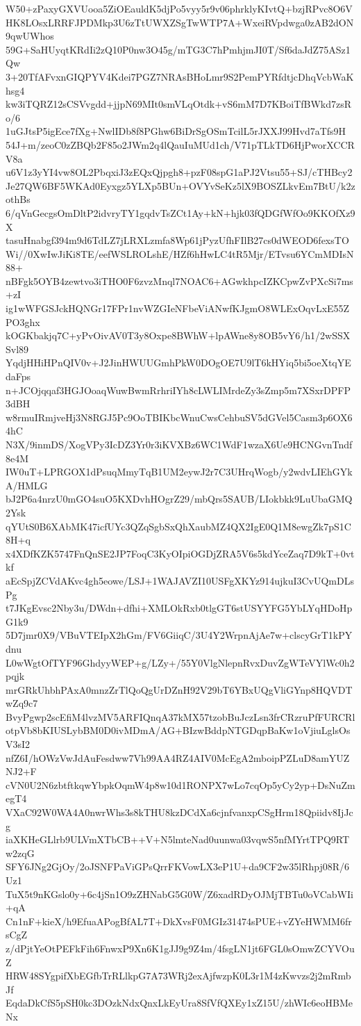 W50+zPaxyGXVUooa5ZiOEauldK5djPo5vyy5r9v06phrklyKIvtQ+bzjRPvc8O6V
HK8LOsxLRRFJPDMkp3U6zTtUWXZSgTwWTP7A+WxeiRVpdwga0zAB2dON9qwUWhos
59G+SaHUyqtKRdIi2zQ10P0nw3O45g/mTG3C7hPmhjmJI0T/Sf6daJdZ75ASz1Qw
3+20TfAFvxnGIQPYV4Kdei7PGZ7NRAsBHoLmr9S2PemPYRfdtjcDhqVcbWaKhsg4
kw3iTQRZ12sCSVvgdd+jjpN69MIt0smVLqOtdk+vS6mM7D7KBoiTfBWkd7zsRo/6
1uGJtsP5igEce7fXg+NwlIDb8f8PGhw6BiDrSgOSmTcilL5rJXXJ99Hvd7aTfs9H
54J+m/zeoC0zZBQb2F85o2JWm2q4lQauIuMUd1ch/V71pTLkTD6HjPworXCCRV8a
u6V1z3yYI4vw8OL2PbqxiJ3zEQxQjpgh8+pzF08spG1aPJ2Vtsu55+SJ/cTHBcy2
Je27QW6BF5WKAd0Eyxgz5YLXp5BUn+OVYvSeKz5lX9BOSZLkvEm7BtU/k2zothBs
6/qVnGecgsOmDltP2idvryTY1gqdvTsZCt1Ay+kN+hjk03fQDGfWfOo9KKOfXz9X
tasuHnabgf394m9d6TdLZ7jLRXLzmfa8Wp61jPyzUfhFIlB27cs0dWEOD6fexsTO
Wi//0XwIwJiKi8TE/eefWSLROLshE/HZf6hHwLC4tR5Mjr/ETvsu6YCmMDIsN88+
nBFgk5OYB4zewtvo3iTHO0F6zvzMnql7NOAC6+AGwkhpcIZKCpwZvPXcSi7ms+zI
ig1wWFGSJckHQNGr17FPr1nvWZGIeNFbeViANwfKJgmO8WLExOqvLxE55ZPO3ghx
kOGKbakjq7C+yPvOivAV0T3y8Oxpe8BWhW+lpAWne8y8OB5vY6/h1/2wSSXSvl89
YqdjHHiHPnQIV0v+J2JinHWUUGmhPkW0DOgOE7U9lT6kHYiq5bi5oeXtqYEdaFps
n+JCOjqqaf3HGJOoaqWuwBwmRrhriIYh8cLWLIMrdeZy3sZmp5m7XSxrDPFP3dBH
w8rmuIRmjveHj3N8RGJ5Pc9OoTBIKbcWnuCwsCehbuSV5dGVel5Casm3p6OX64hC
N3X/9inmDS/XogVPy3IcDZ3Yr0r3iKVXBz6WC1WdF1wzaX6Ue9HCNGvnTndf8e4M
IW0uT+LPRGOX1dPsuqMmyTqB1UM2eywJ2r7C3UHrqWogb/y2wdvLIEhGYkA/HMLG
bJ2P6a4nrzU0mGO4suO5KXDvhHOgrZ29/mbQrs5SAUB/LIokbkk9LuUbaGMQ2Ysk
qYUtS0B6XAbMK47icfUYc3QZqSgbSxQhXaubMZ4QX2IgE0Q1M8ewgZk7pS1C8H+q
x4XDfKZK5747FnQnSE2JP7FoqC3KyOIpiOGDjZRA5V6s5kdYceZaq7D9kT+0vtkf
aEcSpjZCVdAKvc4gh5eowe/LSJ+1WAJAVZI10USFgXKYz914ujkuI3CvUQmDLsPg
t7JKgEvsc2Nby3u/DWdn+dfhi+XMLOkRxb0tlgGT6stUSYYFG5YbLYqHDoHpG1k9
5D7jmr0X9/VBuVTEIpX2hGm/FV6GiiqC/3U4Y2WrpnAjAe7w+clscyGrT1kPYdnu
L0wWgtOfTYF96GhdyyWEP+g/LZy+/55Y0VlgNlepnRvxDuvZgWTeVYlWc0h2pqjk
mrGRkUhbhPAxA0mnzZrTlQoQgUrDZnH92V29bT6YBxUQgVliGYnp8HQVDTwZq9c7
BvyPgwp2scEfiM4lvzMV5ARFIQnqA37kMX57tzobBuJczLsn3frCRzruPfFURCRl
otpVb8bKIUSLybBM0D0ivMDmA/AG+BIzwBddpNTGDqpBaKw1oVjiuLglsOsV3sI2
nfZ6I/hOWzVwJdAuFesdww7Vh99AA4RZ4AIV0McEgA2mboipPZLuD8amYUZNJ2+F
cVN0U2N6zbtftkqwYbpkOqmW4p8w10d1RONPX7wLo7cqOp5yCy2yp+DsNuZmegT4
VXaC92W0WA4A0nwrWhs3s8kTHU8kzDCdXa6cjnfvanxpCSgHrm18Qpiidv8IjJcg
iaXKHeGLlrb9ULVmXTbCB++V+N5lmteNad0uunwa03vqwS5nfMYrtTPQ9RTw2zqG
SFY6JNg2GjOy/2oJSNFPaViGPsQrrFKVowLX3eP1U+da9CF2w35lRhpj08R/6Uz1
TuX5t9nKGslo0y+6c4jSn1O9zZHNabG5G0W/Z6xadRDyOJMjTBTu0oVCabWIi+qA
Cn1nF+kieX/h9EfuaAPogBfAL7T+DkXvsF0MGIz31474sPUE+vZYeHWMM6frsCgZ
z/dPjtYeOtPEFkFih6FnwxP9Xn6K1gJJ9g9Z4m/4fsgLN1jt6FGL0sOmwZCYVOuZ
HRW48SYgpifXbEGfbTrRLlkpG7A73WRj2exAjfwzpK0L3r1M4zKwvzs2j2mRmbJf
EqdaDkCfS5pSH0kc3DOzkNdxQnxLkEyUra8SfVfQXEy1xZ15U/zhWIc6eoHBMeNx
